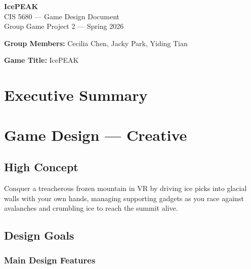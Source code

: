 \documentclass[12pt]{article}
\begin{document}
\begin{center}
    {\LARGE \textbf{IcePEAK}}\\[0.3em]
    {\large CIS 5680 --- Game Design Document}\\[0.3em]
    {\normalsize Group Game Project 2 --- Spring 2026}
\end{center}

\vspace{0.5em}
\textbf{Group Members:} Cecilia Chen, Jacky Park, Yiding Tian

\textbf{Game Title:} IcePEAK

\newpage

\section{Executive Summary}


\newpage

\section{Game Design --- Creative}

\subsection{High Concept}
Conquer a treacherous frozen mountain in VR by driving ice picks into glacial walls with your own hands, managing supporting gadgets as you race against avalanches and crumbling ice to reach the summit alive.

\subsection{Design Goals}

\subsubsection{Main Design Features}
\end{document}
